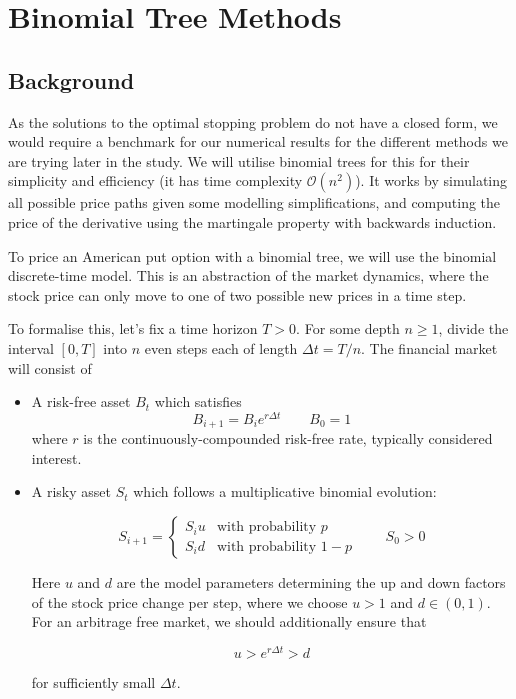 \chapter{Binomial Tree Methods}

\section{Background}

As the solutions to the optimal stopping problem do not have a closed form, we would require a benchmark for our numerical results for the different methods we are trying later in the study. We will utilise binomial trees for this for their simplicity and efficiency (it has time complexity $\mathcal O(n^2)$). It works by simulating all possible price paths given some modelling simplifications, and computing the price of the derivative using the martingale property with backwards induction.

To price an American put option with a binomial tree, we will use the binomial discrete-time model. This is an abstraction of the market dynamics, where the stock price can only move to one of two possible new prices in a time step.

To formalise this, let’s fix a time horizon $T > 0$. For some depth $n \ge 1$, divide the interval $[0, T]$ into $n$ even steps each of length $\Delta t = T/n$. The financial market will consist of
\begin{itemize}
    \item A risk-free asset $B_t$ which satisfies
    $$
    B_{i+1} = B_i e^{r\Delta t} \qquad B_0 = 1
    $$
    where $r$ is the continuously-compounded risk-free rate, typically considered interest.
    \item A risky asset $S_t$ which follows a multiplicative binomial evolution:
    
    $$
    S_{i+1} = \begin{cases}
    S_i u & \text{with probability }p \\S_i d & \text{with probability }1-p
    \end{cases}\qquad S_0 > 0
    $$
    
    Here $u$ and $d$ are the model parameters determining the up and down factors of the stock price change per step, where we choose $u > 1$ and $d \in (0,1)$. For an arbitrage free market, we should additionally ensure that
    
    $$
    u > e^{r\Delta t} > d
    $$
    
    for sufficiently small $\Delta t$.
\end{itemize}


